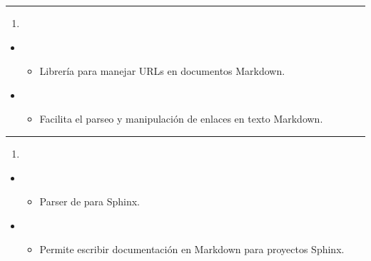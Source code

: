 \documentclass[a4paper,10pt,oneside,spanish,openany]{sphinxmanual}
\begin{document}
\bigskip\hrule\bigskip

\begin{enumerate}
%
\setcounter{enumi}{12}
\item {} 
\sphinxAtStartPar
{}

\end{enumerate}
\begin{itemize}
\item {} 
\sphinxAtStartPar
{}
\begin{itemize}
\item {} 
\sphinxAtStartPar
Librería para manejar URLs en documentos Markdown.

\end{itemize}

\item {} 
\sphinxAtStartPar
{}
\begin{itemize}
\item {} 
\sphinxAtStartPar
Facilita el parseo y manipulación de enlaces en texto Markdown.

\end{itemize}

\end{itemize}


\bigskip\hrule\bigskip

\begin{enumerate}
%
\setcounter{enumi}{13}
\item {} 
\sphinxAtStartPar
{}

\end{enumerate}
\begin{itemize}
\item {} 
\sphinxAtStartPar
{}
\begin{itemize}
\item {} 
\sphinxAtStartPar
Parser de  para Sphinx.

\end{itemize}

\item {} 
\sphinxAtStartPar
{}
\begin{itemize}
\item {} 
\sphinxAtStartPar
Permite escribir documentación en Markdown para proyectos Sphinx.

\end{itemize}

\end{itemize}
\end{document}
